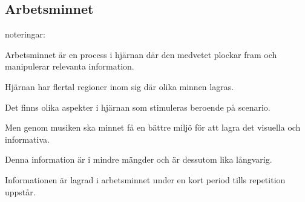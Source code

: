 \documentclass[11p]{article}
\begin{document}
\subsection{Arbetsminnet}
noteringar:
\begin{itemize} Arbetsminnet är en process i hjärnan där den medvetet plockar fram och manipulerar relevanta information. \end{itemize}

\begin{itemize} Hjärnan har flertal regioner inom sig där olika minnen lagras. \end{itemize}
\begin{itemize} Det finns olika aspekter i hjärnan som stimuleras beroende på scenario. \end{itemize}
\begin{itemize}  Men genom musiken ska minnet få en bättre miljö för att lagra det visuella och informativa. \end{itemize}
\begin{itemize}  Denna information är i mindre mängder och är dessutom lika långvarig. \end{itemize}
\begin{itemize} Informationen är lagrad i arbetsminnet under en kort period tills repetition uppstår.  \end{itemize}
\end{document}
